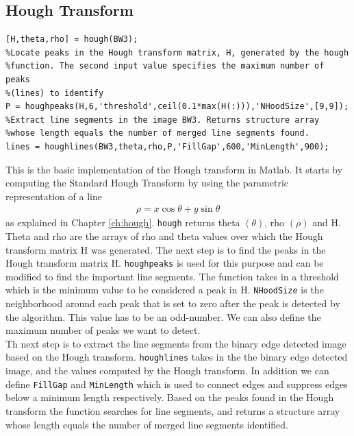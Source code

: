 \subsection{Hough Transform}
\begin{lstlisting}[firstnumber=21]
%Compute Standard Hough Transform of the image BW3.
[H,theta,rho] = hough(BW3);
%Locate peaks in the Hough transform matrix, H, generated by the hough 
%function. The second input value specifies the maximum number of peaks
%(lines) to identify
P = houghpeaks(H,6,'threshold',ceil(0.1*max(H(:))),'NHoodSize',[9,9]);
%Extract line segments in the image BW3. Returns structure array
%whose length equals the number of merged line segments found.
lines = houghlines(BW3,theta,rho,P,'FillGap',600,'MinLength',900);
\end{lstlisting}
This is the basic implementation of the Hough transform in Matlab. It starts by computing the Standard Hough Transform by using the parametric representation of a line 
\begin{align*}
\rho=x\cos{\theta} + y\sin{\theta}
\end{align*}
as explained in Chapter \ref{ch:hough}. \texttt{hough} returns theta $(\theta)$, rho $(\rho)$ and H. Theta and rho are the arrays of rho and theta values over which the Hough transform matrix H was generated. The next step is to find the peaks in the Hough transform matrix H. \texttt{houghpeaks} is used for this purpose and can be modified to find the important line segments. The function takes in a threshold which is the minimum value to be considered a peak in H. \texttt{NHoodSize} is the neighborhood around each peak that is set to zero after the peak is detected by the algorithm. This value has to be an odd-number. We can also define the maximum number of peaks we want to detect.\\

Th next step is to extract the line segments from the binary edge detected image based on the Hough transform. \texttt{houghlines} takes in the the binary edge detected image, and the values computed by the Hough transform. In addition we can define \texttt{FillGap} and \texttt{MinLength} which is used to connect edges and suppress edges below a minimum length respectively. Based on the peaks found in the Hough transform the function searches for line segments, and returns a structure array whose length equals the number of merged line segments identified.\\

